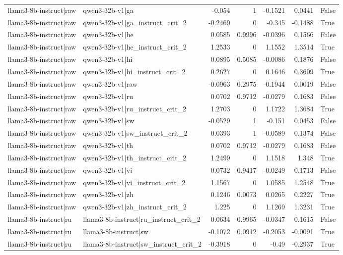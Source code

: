 \begin{table}
\begin{tabular}{l l r r r r l}
llama3-8b-instruct|raw & qwen3-32b-v1|ga & -0.054 & 1 & -0.1521 & 0.0441 & False \\
llama3-8b-instruct|raw & qwen3-32b-v1|ga_instruct_crit_2 & -0.2469 & 0 & -0.345 & -0.1488 & True \\
llama3-8b-instruct|raw & qwen3-32b-v1|he & 0.0585 & 0.9996 & -0.0396 & 0.1566 & False \\
llama3-8b-instruct|raw & qwen3-32b-v1|he_instruct_crit_2 & 1.2533 & 0 & 1.1552 & 1.3514 & True \\
llama3-8b-instruct|raw & qwen3-32b-v1|hi & 0.0895 & 0.5085 & -0.0086 & 0.1876 & False \\
llama3-8b-instruct|raw & qwen3-32b-v1|hi_instruct_crit_2 & 0.2627 & 0 & 0.1646 & 0.3609 & True \\
llama3-8b-instruct|raw & qwen3-32b-v1|raw & -0.0963 & 0.2975 & -0.1944 & 0.0019 & False \\
llama3-8b-instruct|raw & qwen3-32b-v1|ru & 0.0702 & 0.9712 & -0.0279 & 0.1683 & False \\
llama3-8b-instruct|raw & qwen3-32b-v1|ru_instruct_crit_2 & 1.2703 & 0 & 1.1722 & 1.3684 & True \\
llama3-8b-instruct|raw & qwen3-32b-v1|sw & -0.0529 & 1 & -0.151 & 0.0453 & False \\
llama3-8b-instruct|raw & qwen3-32b-v1|sw_instruct_crit_2 & 0.0393 & 1 & -0.0589 & 0.1374 & False \\
llama3-8b-instruct|raw & qwen3-32b-v1|th & 0.0702 & 0.9712 & -0.0279 & 0.1683 & False \\
llama3-8b-instruct|raw & qwen3-32b-v1|th_instruct_crit_2 & 1.2499 & 0 & 1.1518 & 1.348 & True \\
llama3-8b-instruct|raw & qwen3-32b-v1|vi & 0.0732 & 0.9417 & -0.0249 & 0.1713 & False \\
llama3-8b-instruct|raw & qwen3-32b-v1|vi_instruct_crit_2 & 1.1567 & 0 & 1.0585 & 1.2548 & True \\
llama3-8b-instruct|raw & qwen3-32b-v1|zh & 0.1246 & 0.0073 & 0.0265 & 0.2227 & True \\
llama3-8b-instruct|raw & qwen3-32b-v1|zh_instruct_crit_2 & 1.225 & 0 & 1.1269 & 1.3231 & True \\
llama3-8b-instruct|ru & llama3-8b-instruct|ru_instruct_crit_2 & 0.0634 & 0.9965 & -0.0347 & 0.1615 & False \\
llama3-8b-instruct|ru & llama3-8b-instruct|sw & -0.1072 & 0.0912 & -0.2053 & -0.0091 & True \\
llama3-8b-instruct|ru & llama3-8b-instruct|sw_instruct_crit_2 & -0.3918 & 0 & -0.49 & -0.2937 & True \\

\end{tabular}
\end{table}
